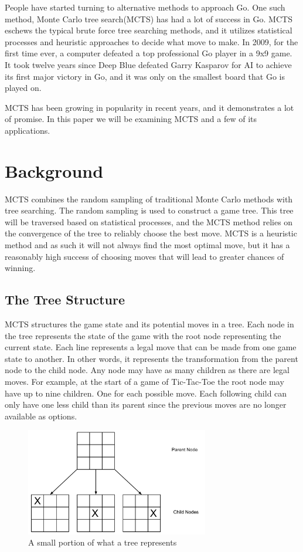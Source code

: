 \documentclass{sig-alternate}
\begin{document}
People have started turning to alternative methods to approach Go. One such method, Monte Carlo tree search(MCTS) has had a lot of success in Go. MCTS eschews the typical brute force tree searching methods, and it utilizes statistical processes and heuristic approaches to decide what move to make. In 2009, for the first time ever, a computer defeated a top professional Go player in a 9x9 game\cite{TheGrandChallenge}. It took twelve years since Deep Blue defeated Garry Kasparov for AI to achieve its first major victory in Go, and it was only on the smallest board that Go is played on.

MCTS has been growing in popularity in recent years, and it demonstrates a lot of promise. In this paper we will be examining MCTS and a few of its applications.  
\section{Background}
MCTS combines the random sampling of traditional Monte Carlo methods with tree searching. The random sampling is used to construct a game tree. This tree will be traversed based on statistical processes, and the MCTS method relies on the convergence of the tree to reliably choose the best move. MCTS is a heuristic method and as such it will not always find the most optimal move, but it has a reasonably high success of choosing moves that will lead to greater chances of winning.
\subsection{The Tree Structure}
MCTS structures the game state and its potential moves in a tree. Each node in the tree represents the state of the game with the root node representing the current state. Each line represents a legal move that can be made from one game state to another. In other words, it represents the transformation from the parent node to the child node. Any node may have as many children as there are legal moves. For example, at the start of a game of Tic-Tac-Toe the root node may have up to nine children. One for each possible move. Each following child can only have one less child than its parent since the previous moves are no longer available as options.
\begin{figure}[h]
\includegraphics[width=8cm]{TicTacToeTree.pdf}
\centering
\caption{A small portion of what a tree represents}
\label{fig:TicTacToe}
\end{figure}
\end{document}
